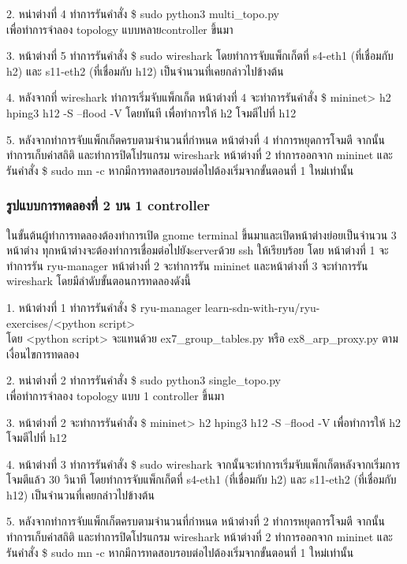 2. หน่าต่างที่ 4 ทำการรันคำสั่ง    
\$ sudo python3 multi\_topo.py \\
เพื่อทำการจำลอง topology แบบหลาย\gls{controller} ขึ้นมา

3. หน้าต่างที่ 5 ทำการรันคำสั่ง 
\$ sudo wireshark 
โดยทำการจับแพ็กเก็ตที่ s4-eth1 (ที่เชื่อมกับ h2) และ s11-eth2 (ที่เชื่อมกับ h12) เป็นจำนวนที่เคยกล่าวไปข้างต้น

4. หลังจากที่ wireshark ทำการเริ่มจับแพ็กเก็ต หน้าต่างที่ 4 จะทำการรันคำสั่ง \$ mininet> h2 hping3 h12 -S --flood -V
โดยทันที เพื่อทำการให้ h2 โจมตีไปที่ h12

5. หลังจากทำการจับแพ็กเก็ตครบตามจำนวนที่กำหนด หน้าต่างที่ 4 ทำการหยุดการโจมตี จากนั้นทำการเก็บค่าสถิติ และทำการปิดโปรแกรม wireshark
หน้าต่างที่ 2 ทำการออกจาก mininet และรันคำสั่ง \$ sudo mn -c หากมีการทดสอบรอบต่อไปต้องเริ่มจากขั้นตอนที่ 1 ใหม่เท่านั้น

\subsubsection*{รูปแบบการทดลองที่ 2 บน 1 \gls{controller}}

ในขั้นต้นผู้ทำการทดลองต้องทำการเปิด gnome terminal ขึ้นมาและเปิดหน้าต่างย่อยเป็นจำนวน 3 หน้าต่าง
ทุกหน้าต่างจะต้องทำการเชื่อมต่อไปยัง\gls{server}ด้วย ssh ให้เรียบร้อย
โดย หน้าต่างที่ 1 จะทำการรัน ryu-manager หน้าต่างที่ 2 จะทำการรัน mininet และหน้าต่างที่ 3 จะทำการรัน wireshark
โดยมีลำดับขั้นตอนการทดลองดังนี้


1. หน้าต่างที่ 1 ทำการรันคำสั่ง    
\$ ryu-manager learn-sdn-with-ryu/ryu-exercises/<python script> \\
โดย <python script> จะแทนด้วย ex7\_group\_tables.py หรือ ex8\_arp\_proxy.py ตามเงื่อนไขการทดลอง

2. หน่าต่างที่ 2 ทำการรันคำสั่ง    
\$ sudo python3 single\_topo.py \\
เพื่อทำการจำลอง topology แบบ 1 \gls{controller} ขึ้นมา

3. หน้าต่างที่ 2 จะทำการรันคำสั่ง \$ mininet> h2 hping3 h12 -S --flood -V
เพื่อทำการให้ h2 โจมตีไปที่ h12

4. หน้าต่างที่ 3 ทำการรันคำสั่ง 
\$ sudo wireshark 
จากนั้นจะทำการเริ่มจับแพ็กเก็ตหลังจากเริ่มการโจมตีแล้ว 30 วินาที
โดยทำการจับแพ็กเก็ตที่ s4-eth1 (ที่เชื่อมกับ h2) และ s11-eth2 (ที่เชื่อมกับ h12) เป็นจำนวนที่เคยกล่าวไปข้างต้น


5. หลังจากทำการจับแพ็กเก็ตครบตามจำนวนที่กำหนด หน้าต่างที่ 2 ทำการหยุดการโจมตี จากนั้นทำการเก็บค่าสถิติ และทำการปิดโปรแกรม wireshark
หน้าต่างที่ 2 ทำการออกจาก mininet และรันคำสั่ง \$ sudo mn -c หากมีการทดสอบรอบต่อไปต้องเริ่มจากขั้นตอนที่ 1 ใหม่เท่านั้น

